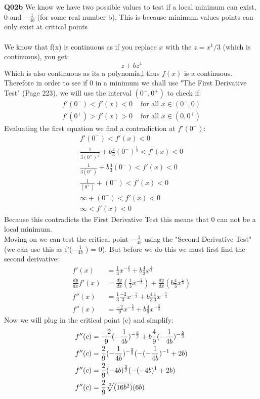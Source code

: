 \documentclass[11pt]{article}
\begin{document}
\textbf{Q02b} We know we have two possible values to test if a local minimum can exist, 0 and $-\frac{1}{4b}$ (for some real number b). This is because minimum values points can only exist at critical points\\\\
We know that f(x) is continuous as if you replace $x$ with the $z = x^1/3$ (which is continuous), you get:
\[ z + bz^4 \]
Which is also continuous as its a polynomia,l thus $f(x)$ is a continuous. Therefore in order to see if 0 in a minimum we shall use "The First Derivative Test" (Page 223),  we will use the interval $(0^-,0^+)$ to check if:
\begin{align*}
f'(0^-)<f'(x) < 0 &\text{ for all $x \in (0^-,0)$} \\
f'(0^+)>f'(x) > 0 &\text{ for all $x \in (0,0^+)$}
\end{align*}
Evaluating the first equation we find a contradiction at $f'(0^-)$:
\begin{align*}
f'(0^-)< f'(x) < 0 \\
\frac{1}{3(0^-)^{\frac{2}{3}}} + b\frac{4}{3}(0^-)^{\frac{1}{3}}< f'(x) < 0 \\
\frac{1}{3(0^+)} + b\frac{4}{3}(0^-)< f'(x) < 0 \\
\frac{1}{(0^+)} + (0^-)< f'(x) < 0 \\
\infty + (0^-)< f'(x) < 0 \\
\infty < f'(x) < 0 
\end{align*}
Because this contradicts the First Derivative Test this means that 0 can not be a local minimum.\\
Moving on we can test the critical point $-\frac{1}{4b}$ using the "Second Derivative Test" (we can use this as f'($-\frac{1}{4b}$ ) = 0). But before we do this we must first find the second derivative:
\begin{align*}
f'(x) & = \frac{1}{3}x^{-\frac{2}{3}} + b\frac{4}{3}x^{\frac{1}{3}}\\
\frac{dy}{dx}f'(x) & = \frac{dy}{dx}(\frac{1}{3}x^{-\frac{2}{3}}) + \frac{dy}{dx}(b\frac{4}{3}x^{\frac{1}{3}})\\
f''(x) & = \frac{1}{3}\frac{-2}{3}x^{-\frac{5}{3}} + b\frac{4}{3}\frac{1}{3}x^{-\frac{2}{3}}\\
f''(x) & = \frac{-2}{9}x^{-\frac{5}{3}} + b\frac{4}{9}x^{-\frac{2}{3}}
\end{align*}
Now we will plug in the critical point (c) and simplify:
\begin{align*}
f''(c) & = \frac{-2}{9}(-\frac{1}{4b})^{-\frac{5}{3}} + b\frac{4}{9}(-\frac{1}{4b})^{-\frac{2}{3}}\\
f''(c) & = \frac{2}{9}(-\frac{1}{4b})^{-\frac{2}{3}}(-(-\frac{1}{4b})^{-1}+2b) \\
f''(c) & = \frac{2}{9}(-4b)^{\frac{2}{3}}(-(-4b)^{1}+2b) \\
f''(c) & = \frac{2}{9}\sqrt[\leftroot{-2}\uproot{2}3]{(16b^2)}(6b) 
\end{align*}
\end{document}
